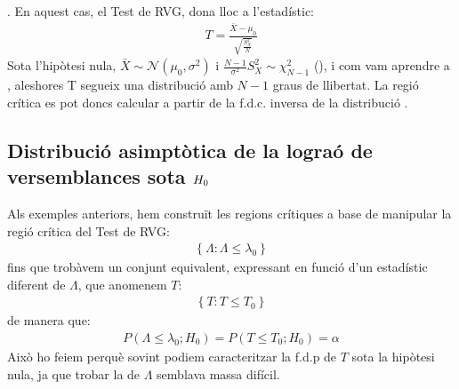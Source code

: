 \documentclass[letterpaper,10pt,english]{sphinxmanual}
\begin{document}
. En aquest cas,
el Test de RVG, dona lloc a  l’estadístic:
\begin{equation*}
\begin{split}T = \frac{\bar{X} - \mu_0}{\sqrt{\frac{S_X^2}{N}}}\end{split}
\end{equation*}
Sota l’hipòtesi nula, \(\bar{X} \sim \mathcal{N}(\mu_0, \sigma^2)\)
i \(\frac{N-1}{\sigma^2}S_X^2 \sim \chi^2_{N-1}\) (),
i com vam aprendre a ,
aleshores T segueix una distribució  amb \(N-1\) graus de llibertat. La regió crítica
es pot doncs calcular a partir de la f.d.c. inversa de la distribució .


\subsection{Distribució asimptòtica de la log\sphinxhyphen{}raó de versemblances sota \protect\(H_0\protect\)}
\label{\detokenize{0_Intro/0_4_Tests:distribucio-asimptotica-de-la-log-rao-de-versemblances-sota-h-0}}
Als exemples anteriors, hem construït les regions crítiques a base de manipular
la regió crítica del Test de RVG:
\begin{equation*}
\begin{split}\left\{\Lambda: \Lambda \leq \lambda_0\right\}\end{split}
\end{equation*}
fins que trobàvem un conjunt equivalent, expressant en funció d’un estadístic diferent de
\(\Lambda\), que anomenem \(T\):
\begin{equation*}
\begin{split}\left\{T: T \leq T_0\right\}\end{split}
\end{equation*}
de manera que:
\begin{equation*}
\begin{split}P(\Lambda \leq \lambda_0; H_0) = P( T \leq T_0 ; H_0) = \alpha\end{split}
\end{equation*}
Això ho feiem perquè sovint podiem caracteritzar la f.d.p de \(T\) sota la hipòtesi nula,
ja que trobar la de \(\Lambda\) semblava massa difícil.
\end{document}
